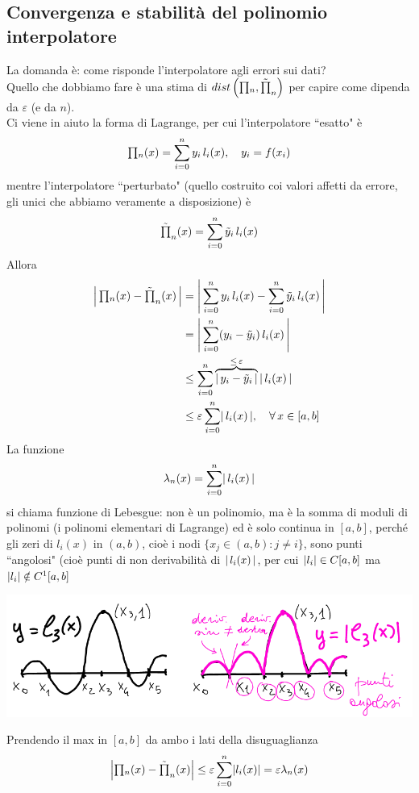 \subsection{Convergenza e stabilità del polinomio interpolatore}
La domanda è: come risponde l'interpolatore agli errori sui dati?\\
Quello che dobbiamo fare è una stima di $dist \left(\inter_n, \Tilde{\inter}_n \right)$ per capire come dipenda da $\varepsilon$ (e da $n$).\\
Ci viene in aiuto la forma di Lagrange, per cui l'interpolatore ``esatto" è
\[\inter_n(x) = \sum_{i=0}^n y_i \, l_i(x), \quad y_i = f(x_i)\]
mentre l'interpolatore ``perturbato" (quello costruito coi valori affetti da errore, gli unici che abbiamo veramente a disposizione) è
\[\Tilde{\inter}_n(x) = \sum_{i=0}^n \Tilde{y}_i \, l_i(x)\]
Allora
\[\begin{split}
    \abs*{\,\inter_n(x) - \Tilde{\inter}_n(x)\,} & = \abs*{\,\sum_{i=0}^n y_i \, l_i(x) - \sum_{i=0}^n \Tilde{y}_i \, l_i(x)\,} \\
    & = \abs*{\,\sum_{i=0}^n (y_i - \Tilde{y}_i)\, l_i(x) \,} \\
    & \le \sum_{i=0}^n \overbrace{\abs*{\,y_i - \tilde{y}_i\,}}^{\le\, \varepsilon}\, \abs{\,l_i(x)\,} \\
    & \le \varepsilon \sum_{i=0}^n \abs{\,l_i(x)\,}, \quad \forall\, x \in [a,b]
\end{split}\]
La funzione 
\[\lambda_n(x) = \sum_{i=0}^n \abs*{\,l_i(x)\,}\]
si chiama funzione di Lebesgue: non è un polinomio, ma è la somma di moduli di polinomi (i polinomi elementari di Lagrange) ed è solo continua in $[a,b]$, perché gli zeri di $l_i(x)$ in $(a,b)$, cioè i nodi $\{x_j \in (a,b) : j \ne i\}$, sono punti ``angolosi" (cioè punti di non derivabilità di $\abs{\,l_i(x)\,}$, per cui $\abs{l_i}\in C[a,b]$ ma $\abs{l_i} \notin C^1[a,b]$
\begin{center}
    \includegraphics[scale=0.8]{foto/lez13_img2}
\end{center}
Prendendo il max in $[a,b]$ da ambo i lati della disuguaglianza 
\[ \abs*{\inter_n(x)-\tilde{\inter}_n(x)}\leq \varepsilon  \sum_{i=0}^n \abs{l_i(x)}=\varepsilon\lambda_n(x) \]
